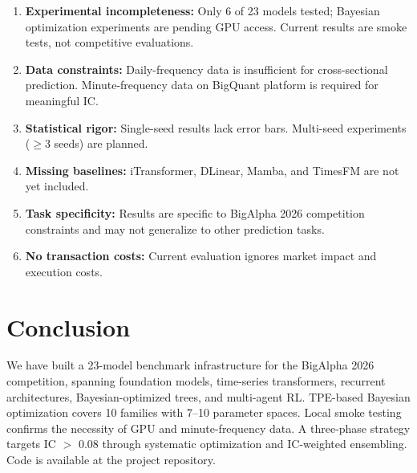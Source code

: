 \documentclass[sigconf,10pt]{acmart}
\begin{document}
\begin{enumerate}
  \item \textbf{Experimental incompleteness:} Only 6 of 23 models tested; Bayesian optimization experiments are pending GPU access. Current results are smoke tests, not competitive evaluations.
  \item \textbf{Data constraints:} Daily-frequency data is insufficient for cross-sectional prediction. Minute-frequency data on BigQuant platform is required for meaningful IC.
  \item \textbf{Statistical rigor:} Single-seed results lack error bars. Multi-seed experiments ($\ge 3$ seeds) are planned.
  \item \textbf{Missing baselines:} iTransformer, DLinear, Mamba, and TimesFM are not yet included.
  \item \textbf{Task specificity:} Results are specific to BigAlpha 2026 competition constraints and may not generalize to other prediction tasks.
  \item \textbf{No transaction costs:} Current evaluation ignores market impact and execution costs.
\end{enumerate}

\section{Conclusion}

We have built a 23-model benchmark infrastructure for the BigAlpha 2026 competition, spanning foundation models, time-series transformers, recurrent architectures, Bayesian-optimized trees, and multi-agent RL. TPE-based Bayesian optimization covers 10 families with 7--10 parameter spaces. Local smoke testing confirms the necessity of GPU and minute-frequency data. A three-phase strategy targets IC $>$ 0.08 through systematic optimization and IC-weighted ensembling. Code is available at the project repository.
\end{document}
